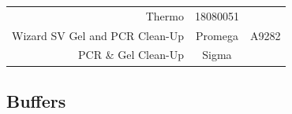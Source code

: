 \documentclass[11pt,singlespacinge,twoside]{reedthesis} %
\begin{document}
\begin{longtable}[]{@{}rcl@{}}
\begin{minipage}[t]{0.26\columnwidth}
Thermo\strut
\end{minipage} & \begin{minipage}[t]{0.16\columnwidth}\raggedright
18080051\strut
\end{minipage}\tabularnewline
\begin{minipage}[t]{0.50\columnwidth}\raggedleft
Wizard SV Gel and PCR Clean-Up\strut
\end{minipage} & \begin{minipage}[t]{0.26\columnwidth}\centering
Promega\strut
\end{minipage} & \begin{minipage}[t]{0.16\columnwidth}\raggedright
A9282\strut
\end{minipage}\tabularnewline
\begin{minipage}[t]{0.50\columnwidth}\raggedleft
PCR \& Gel Clean-Up\strut
\end{minipage} & \begin{minipage}[t]{0.26\columnwidth}\centering
Sigma\strut
\end{minipage} & \begin{minipage}[t]{0.16\columnwidth}\raggedright
\strut
\end{minipage}\tabularnewline
\bottomrule
\end{longtable}
\hypertarget{mat-buff}{%
\subsection{Buffers}\label{mat-buff}}
\end{document}
